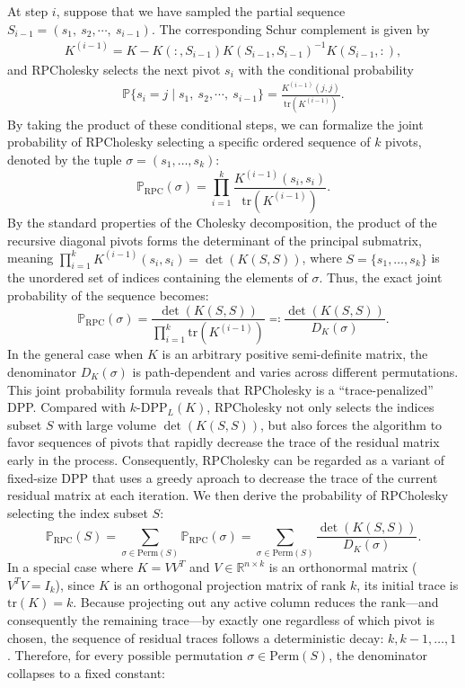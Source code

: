 \documentclass[11pt]{article}
\newcommand{\be}{\begin{eqnarray}}
\newcommand{\ee}{\end{eqnarray}}
\newcommand{\<}{\langle}
\renewcommand{\>}{\rangle}
\begin{document}
At step $i$, suppose that we have sampled the partial sequence $S_{i-1} = (s_1,\ s_2,\cdots,\ s_{i-1})$. The corresponding Schur complement is given by
\be
K^{(i-1)} = K - K(:,S_{i-1})K(S_{i-1},S_{i-1})^{-1}K(S_{i-1},:), 
\ee
and RPCholesky selects the next pivot $s_i$ with the conditional probability 
\be
\mathbb{P}\{s_i = j \mid s_1,\ s_2,\cdots,\ s_{i-1}\} = \frac{K^{(i-1)}(j,j)}{\text{tr}(K^{(i-1)})}.
\ee
By taking the product of these conditional steps, we can formalize the joint probability of RPCholesky selecting a specific ordered sequence of $k$ pivots, denoted by the tuple $\sigma = (s_1, \dots, s_k)$:
\begin{equation}
\mathbb{P}_{\text{RPC}}(\sigma) = \prod_{i=1}^k \frac{K^{(i-1)}(s_i, s_i)}{\text{tr}(K^{(i-1)})}.
\end{equation} 
By the standard properties of the Cholesky decomposition, the product of the recursive diagonal pivots forms the determinant of the principal submatrix, meaning $\prod_{i=1}^k K^{(i-1)}(s_i, s_i) = \det(K(S,S))$, where $S = \{s_1, \dots, s_k\}$ is the unordered set of indices containing the elements of $\sigma$. Thus, the exact joint probability of the sequence becomes:
\begin{equation}
\label{eq:rpc_proba}
\mathbb{P}_{\text{RPC}}(\sigma) = \frac{\det(K(S,S))}{\prod_{i=1}^k \text{tr}(K^{(i-1)})} \eqqcolon \frac{\det(K(S,S))}{D_K(\sigma)}.
\end{equation}
In the general case when $K$ is an arbitrary positive semi-definite matrix, the denominator $D_K(\sigma)$ is path-dependent and varies across different permutations. This joint probability formula reveals that RPCholesky is a ``trace-penalized'' DPP. Compared with $k\text{-}\mathrm{DPP}_L(K)$, RPCholesky not only selects the indices subset $S$ with large volume $\det(K(S,S))$, but also forces the algorithm to favor sequences of pivots that rapidly decrease the trace of the residual matrix early in the process. Consequently, RPCholesky can be regarded as a variant of fixed-size DPP that uses a  greedy aproach to decrease the trace of the current residual matrix at each iteration.
We then derive the probability of RPCholesky selecting the index subset $S$: 
\begin{equation}
\label{eq:rpc_subset}
\mathbb{P}_{\text{RPC}}(S) = \sum_{\sigma \in \text{Perm}(S)} \mathbb{P}_{\text{RPC}}(\sigma) = \sum_{\sigma \in \text{Perm}(S)} \frac{\det(K(S,S))}{D_K(\sigma)}.
\end{equation}
In a special case where $K = VV^T$ and $V \in \mathbb{R}^{n \times k}$ is an orthonormal matrix ($V^T V = I_k$), since $K$ is an orthogonal projection matrix of rank $k$, its initial trace is $\text{tr}(K) = k$. Because projecting out any active column reduces the rank—and consequently the remaining trace—by exactly one regardless of which pivot is chosen, the sequence of residual traces follows a deterministic decay: $k, k-1, \dots, 1$. Therefore, for every possible permutation $\sigma \in \text{Perm}(S)$, the denominator collapses to a fixed constant:
\end{document}
